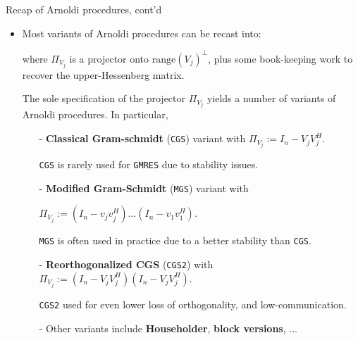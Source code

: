 \documentclass[t,usepdftitle=false]{beamer}
\begin{document}
\begin{frame}{Recap of Arnoldi procedures, cont'd}
\begin{itemize}
\item Most variants of Arnoldi procedures can be recast into:
\vspace{.15cm}
\begin{center}\end{center}
\vspace{.15cm}
where $\Pi_{{V}_j}$ is a projector onto $\text{range}(V_j)^\perp$, plus some book-keeping work to recover the upper-Hessenberg matrix.
\item[] The sole specification of the projector $\Pi_{{V}_j}$ yields a number of variants of Arnoldi procedures.
In particular,
\begin{itemize}\normalsize
\item[-] \textbf{Classical Gram-schmidt} (\texttt{CGS}) variant with $\Pi_{V_j}:=I_n-V_{j}V_{j}^H$.
\item[] \texttt{CGS} is rarely used for \texttt{GMRES} due to stability issues.\vspace{.1cm}
\item[-] \textbf{Modified Gram-Schmidt} (\texttt{MGS}) variant with\\
\begin{center}$\Pi_{V_j}:=(I_n-v_{j}v_{j}^H)\dots(I_n-v_{1}v_{1}^H)$.\end{center}
\item[] \texttt{MGS} is often used in practice due to a better stability than \texttt{CGS}.\vspace{.1cm}
\item[-] \textbf{Reorthogonalized CGS} (\texttt{CGS2}) with $\Pi_{V_j}:=(I_n-V_{j}V_{j}^H)(I_n-V_{j}V_{j}^H)$.
\item[] \texttt{CGS2} used for even lower loss of orthogonality, and low-communication.\vspace{.1cm}
\item[-] Other variants include \textbf{Householder}, \textbf{block versions}, ...
\end{itemize}
\end{itemize}
\end{frame}
\end{document}
